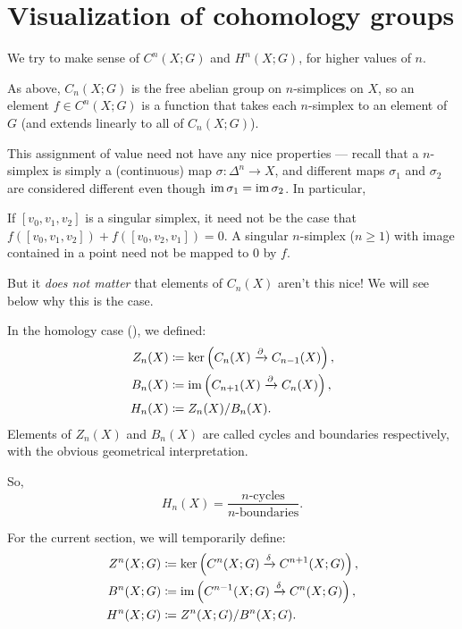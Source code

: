 \section{Visualization of cohomology groups}

We try to make sense of $C^n(X; G)$ and $H^n(X; G)$, for higher values of $n$.

As above, $C_n(X; G)$ is the free abelian group on $n$-simplices on $X$, so an element
$f \in C^n(X; G)$ is a function that takes each $n$-simplex to an element of $G$
(and extends linearly to all of $C_n(X; G)$).

This assignment of value need not have any nice properties --- recall that a $n$-simplex is simply
a (continuous) map $\sigma \colon \Delta^n \to X$, and different maps $\sigma_1$ and
$\sigma_2$ are considered different even though $\operatorname{im} \sigma_1 = \operatorname{im} \sigma_2$.
In particular,
\begin{itemize}
	\ii If $[v_0, v_1, v_2]$ is a singular simplex,
	it need not be the case that $f([v_0, v_1, v_2]) + f([v_0, v_2, v_1]) = 0$.
	\ii A singular $n$-simplex ($n \geq 1$)
	with image contained in a point need not be mapped to $0$ by $f$.
\end{itemize}

But it \emph{does not matter} that elements of $C_n(X)$ aren't this nice!
We will see below why this is the case.

In the homology case (), we defined:
\begin{align*}
	Z_n(X) &\coloneqq \ker\left( C_{n}(X) \xrightarrow{\partial} C_{n-1}(X) \right), \\
	B_n(X) &\coloneqq \operatorname{im} \left( C_{n+1}(X) \xrightarrow{\partial} C_n(X) \right), \\
	H_n(X) &\coloneqq Z_n(X)/B_n(X).
\end{align*}
Elements of $Z_n(X)$ and $B_n(X)$ are called cycles and boundaries respectively,
with the obvious geometrical interpretation.

So,
\[
	H_n(X) = \frac{\text{$n$-cycles}}{\text{$n$-boundaries}}.
\]

For the current section, we will temporarily define:
\begin{align*}
	Z^n(X; G) &\coloneqq \ker\left( C^n(X; G) \xrightarrow{\delta} C^{n+1}(X; G) \right), \\
	B^n(X; G) &\coloneqq \operatorname{im}\left( C^{n-1}(X; G) \xrightarrow{\delta} C^n(X; G) \right), \\
	H^n(X; G) &\coloneqq Z^n(X; G)/B^n(X; G).
\end{align*}


